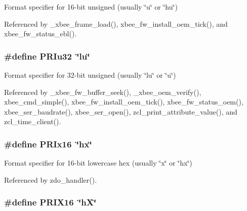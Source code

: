 Format specifier for 16-\/bit unsigned (usually {\ttfamily \char`\"{}u\char`\"{}} or {\ttfamily \char`\"{}hu\char`\"{}}) 



Referenced by \-\_\-xbee\-\_\-frame\-\_\-load(), xbee\-\_\-fw\-\_\-install\-\_\-oem\-\_\-tick(), and xbee\-\_\-fw\-\_\-status\-\_\-ebl().

\hypertarget{group__hal_gaaf2af4a10f0bd308e9c349c8382382be}{
\subsubsection[{P\-R\-Iu32}]{\setlength{\rightskip}{0pt plus 5cm}\#define P\-R\-Iu32~\char`\"{}lu\char`\"{}}}\label{group__hal_gaaf2af4a10f0bd308e9c349c8382382be}


Format specifier for 32-\/bit unsigned (usually {\ttfamily \char`\"{}lu\char`\"{}} or {\ttfamily \char`\"{}u\char`\"{}}) 



Referenced by \-\_\-xbee\-\_\-fw\-\_\-buffer\-\_\-seek(), \-\_\-xbee\-\_\-oem\-\_\-verify(), xbee\-\_\-cmd\-\_\-simple(), xbee\-\_\-fw\-\_\-install\-\_\-oem\-\_\-tick(), xbee\-\_\-fw\-\_\-status\-\_\-oem(), xbee\-\_\-ser\-\_\-baudrate(), xbee\-\_\-ser\-\_\-open(), zcl\-\_\-print\-\_\-attribute\-\_\-value(), and zcl\-\_\-time\-\_\-client().

\hypertarget{group__hal_ga70f5e38b517f714518c970a4da37bef1}{
\subsubsection[{P\-R\-Ix16}]{\setlength{\rightskip}{0pt plus 5cm}\#define P\-R\-Ix16~\char`\"{}hx\char`\"{}}}\label{group__hal_ga70f5e38b517f714518c970a4da37bef1}


Format specifier for 16-\/bit lowercase hex (usually {\ttfamily \char`\"{}x\char`\"{}} or {\ttfamily \char`\"{}hx\char`\"{}}) 



Referenced by zdo\-\_\-handler().

\hypertarget{group__hal_ga570ca9af5087023f75fc8a1a602d26ab}{
\subsubsection[{P\-R\-I\-X16}]{\setlength{\rightskip}{0pt plus 5cm}\#define P\-R\-I\-X16~\char`\"{}h\-X\char`\"{}}}\label{group__hal_ga570ca9af5087023f75fc8a1a602d26ab}


